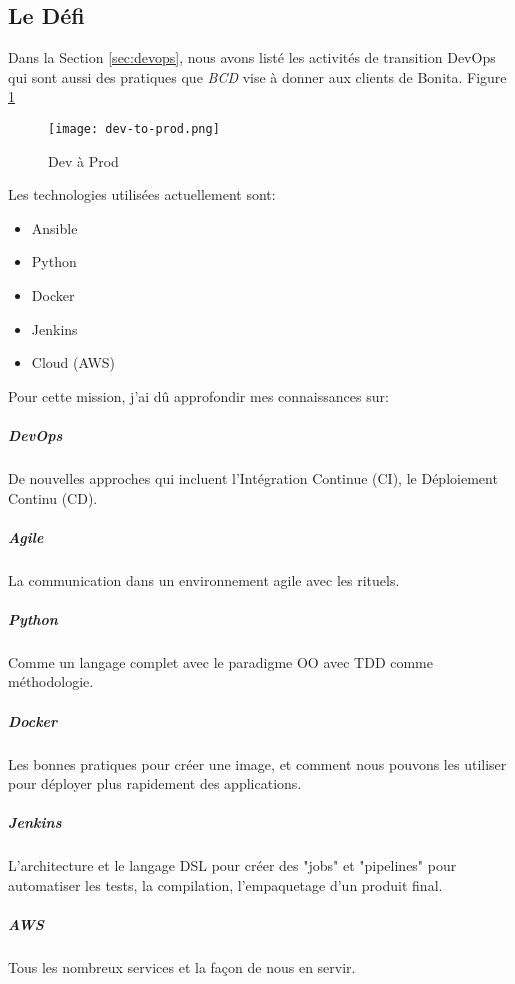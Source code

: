 \subsection{Le Défi}
Dans la Section \ref{sec:devops}, nous avons listé les activités de transition DevOps qui sont aussi des pratiques que \emph{BCD} vise à donner aux clients de Bonita. Figure \ref{fig:dev-to-prod}

\begin{figure}[!ht]
\centering
\texttt{[image: dev-to-prod.png]}
\caption{Dev à Prod}
\label{fig:dev-to-prod}
\end{figure}

Les technologies utilisées actuellement sont:
\begin{itemize}
  \item Ansible
  \item Python
  \item Docker
  \item Jenkins
  \item Cloud (AWS)
\end{itemize}

Pour cette mission, j'ai dû approfondir mes connaissances sur:
\subparagraph{DevOps} De nouvelles approches qui incluent l'Intégration Continue (CI), le Déploiement Continu (CD).
\subparagraph{Agile} La communication dans un environnement agile avec les rituels.
\subparagraph{Python} Comme un langage complet avec le paradigme OO avec TDD comme méthodologie.
\subparagraph{Docker} Les bonnes pratiques pour créer une image, et comment nous pouvons les utiliser pour déployer plus rapidement des applications.
\subparagraph{Jenkins} L’architecture et le langage DSL pour  créer des "jobs" et "pipelines" pour automatiser les tests, la compilation, l’empaquetage d'un produit final.
\subparagraph{AWS} Tous les nombreux services et la façon de nous en servir.
